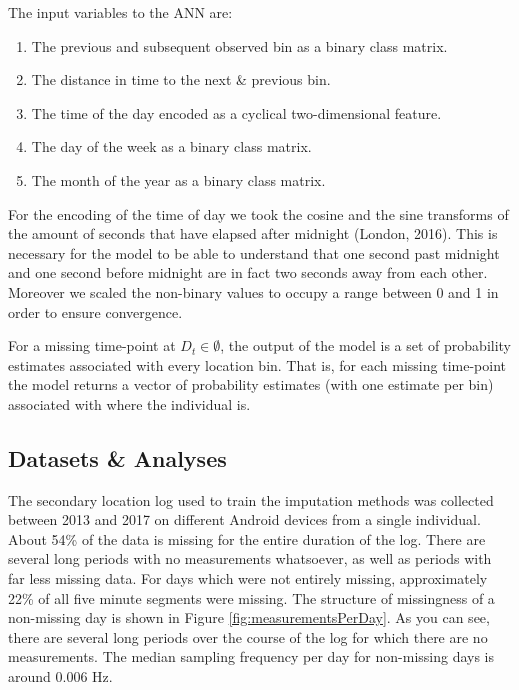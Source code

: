 \documentclass[man]{apa6}
\providecommand{\tightlist}{%
  \setlength{\itemsep}{0pt}\setlength{\parskip}{0pt}}
\theoremstyle{definition}
\theoremstyle{definition}
\theoremstyle{definition}
\theoremstyle{remark}
\begin{document}
The input variables to the ANN are:

\begin{enumerate}
\def\labelenumi{\arabic{enumi}.}
\tightlist
\item
  The previous and subsequent observed bin as a binary class matrix.
\item
  The distance in time to the next \& previous bin.
\item
  The time of the day encoded as a cyclical two-dimensional feature.
\item
  The day of the week as a binary class matrix.
\item
  The month of the year as a binary class matrix.
\end{enumerate}

For the encoding of the time of day we took the cosine and the sine
transforms of the amount of seconds that have elapsed after midnight
(London, 2016). This is necessary for the model to be able to understand
that one second past midnight and one second before midnight are in fact
two seconds away from each other. Moreover we scaled the non-binary
values to occupy a range between 0 and 1 in order to ensure convergence.

For a missing time-point at \(D_t \in \emptyset\), the output of the
model is a set of probability estimates associated with every location
bin. That is, for each missing time-point the model returns a vector of
probability estimates (with one estimate per bin) associated with where
the individual is.

\subsection{Datasets \& Analyses}\label{datasets-analyses}

The secondary location log used to train the imputation methods was
collected between 2013 and 2017 on different Android devices from a
single individual. About 54\% of the data is missing for the entire
duration of the log. There are several long periods with no measurements
whatsoever, as well as periods with far less missing data. For days
which were not entirely missing, approximately 22\% of all five minute
segments were missing. The structure of missingness of a non-missing day
is shown in Figure \ref{fig:measurementsPerDay}. As you can see, there
are several long periods over the course of the log for which there are
no measurements. The median sampling frequency per day for non-missing
days is around 0.006 Hz.
\end{document}
